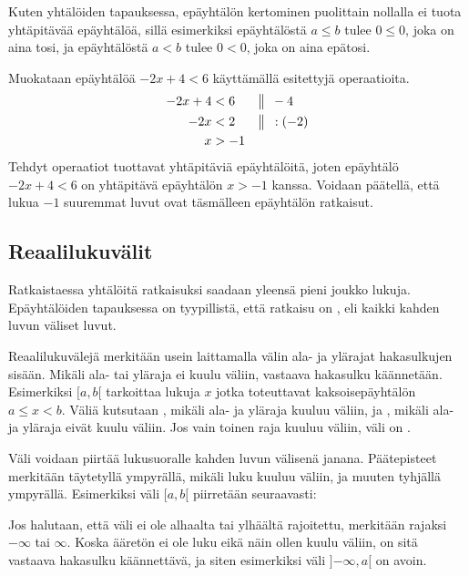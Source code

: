 Kuten yhtälöiden tapauksessa, epäyhtälön kertominen puolittain nollalla ei tuota yhtäpitävää epäyhtälöä, sillä esimerkiksi epäyhtälöstä $a \leq b$ tulee $0 \leq 0$, joka on aina tosi, ja epäyhtälöstä $a < b$ tulee $0 < 0$, joka on aina epätosi.

\begin{esimerkki}
Muokataan epäyhtälöä $-2x+4<6$ käyttämällä esitettyjä operaatioita.
\begin{align*}
-2x+4&<6 && \big\|\hspace{0.5em} -4 \\
-2x&<2 && \big\|\hspace{0.5em} :(-2) \\
x&>-1
\end{align*}
Tehdyt operaatiot tuottavat yhtäpitäviä epäyhtälöitä, joten epäyhtälö $-2x+4<6$ on yhtäpitävä epäyhtälön $x>-1$ kanssa. Voidaan päätellä, että lukua $-1$ suuremmat luvut ovat täsmälleen epäyhtälön ratkaisut.
\end{esimerkki}

\subsection*{Reaalilukuvälit}

Ratkaistaessa yhtälöitä ratkaisuksi saadaan yleensä pieni joukko lukuja. Epäyhtälöiden tapauksessa on tyypillistä, että ratkaisu on , eli kaikki kahden luvun väliset luvut.

Reaalilukuvälejä merkitään usein laittamalla välin ala- ja ylärajat hakasulkujen sisään. Mikäli ala- tai yläraja ei kuulu väliin, vastaava hakasulku käännetään. Esimerkiksi $[a, b[$ tarkoittaa lukuja $x$ jotka toteuttavat kaksoisepäyhtälön $a \leq x < b$. Väliä kutsutaan , mikäli ala- ja yläraja kuuluu väliin, ja , mikäli ala- ja yläraja eivät kuulu väliin. Jos vain toinen raja kuuluu väliin, väli on .

Väli voidaan piirtää lukusuoralle kahden luvun välisenä janana. Päätepisteet merkitään täytetyllä ympyrällä, mikäli luku kuuluu väliin, ja muuten tyhjällä ympyrällä. Esimerkiksi väli $[a, b[$ piirretään seuraavasti:

\begin{lukusuora}{0}{10}{6}
\end{lukusuora}

Jos halutaan, että väli ei ole alhaalta tai ylhäältä rajoitettu, merkitään rajaksi $-\infty$ tai $\infty$. Koska ääretön ei ole luku eikä näin ollen kuulu väliin, on sitä vastaava hakasulku käännettävä, ja siten esimerkiksi väli $]{-\infty}, a[$ on avoin. 

